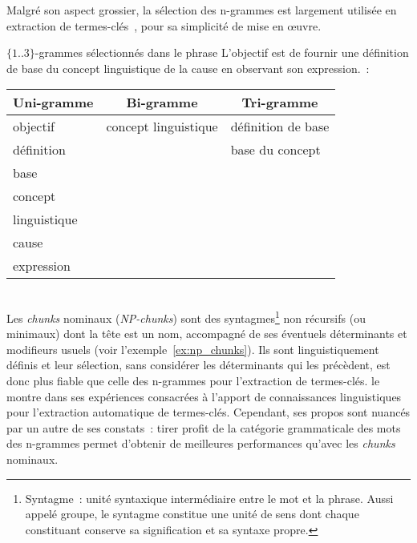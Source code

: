     Malgré son aspect grossier, la sélection des n-grammes est largement
    utilisée en extraction de
    termes-clés~\cite{witten1999kea,hulth2003keywordextraction,medelyan2009humancompetitivetagging},
    pour sa simplicité de mise en \oe{}uvre.

    \begin{example}\label{ex:n_grams}
      $\{1..3\}$-grammes sélectionnés dans le phrase \og{}L'objectif est de
      fournir une définition de base du concept linguistique de la cause en
      observant son expression.\fg{}~:
      \begin{center}
        \begin{tabular}{l|l|l}
          \toprule
          \multicolumn{1}{c|}{\textbf{Uni-gramme}} & \multicolumn{1}{c|}{\textbf{Bi-gramme}} & \multicolumn{1}{c}{\textbf{Tri-gramme}}\\
          \hline
          \og{}objectif\fg{} & \og{}concept linguistique\fg{} & \og{}définition de base\fg{}\\
          \og{}définition\fg{} & & \og{}base du concept\fg{}\\
          \og{}base\fg{} & &\\
          \og{}concept\fg{} & &\\
          \og{}linguistique\fg{} & &\\
          \og{}cause\fg{} & &\\
          \og{}expression\fg{} & &\\
          \bottomrule
        \end{tabular}
      \end{center}\vspace{.25em}
    \end{example}

    ~\\Les \textit{chunks} nominaux
    (\textit{NP-chunks}) sont des syntagmes\footnote{Syntagme~: unité syntaxique
    intermédiaire entre le mot et la phrase. Aussi appelé groupe, le syntagme
    constitue une unité de sens dont chaque constituant conserve sa
    signification et sa syntaxe propre.} non récursifs (ou minimaux) dont la
    tête est un nom, accompagné de ses éventuels déterminants et modifieurs
    usuels (voir l'exemple~\ref{ex:np_chunks}). Ils sont linguistiquement
    définis et leur sélection, sans considérer les déterminants qui les précèdent, est
    donc plus fiable que celle des n-grammes pour l'extraction de termes-clés.
     le montre dans ses expériences
    consacrées à l'apport de connaissances linguistiques pour l'extraction
    automatique de termes-clés. Cependant, ses propos sont nuancés par un autre
    de ses constats~: tirer profit de la catégorie grammaticale des mots des
    n-grammes permet d'obtenir de meilleures performances qu'avec les
    \textit{chunks} nominaux.

